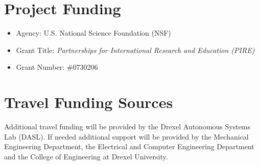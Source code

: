 \documentclass[11pt,a4paper,oneside]{report}
\begin{document}
\section*{Project Funding}
\begin{itemize}
\item Agency: U.S. National Science Foundation (NSF)
\item Grant Title: \textit{Partnerships for International Research
and Education (PIRE)}
\item Grant Number: \#0730206
\end{itemize}

\section*{Travel Funding Sources}
Additional travel funding will be provided by the Drexel Autonomous Systems Lab (DASL).  If needed additional support will be provided by the Mechanical Engineering Department, the Electrical and Computer Engineering Department and the College of Engineering at Drexel University.
\end{document}
